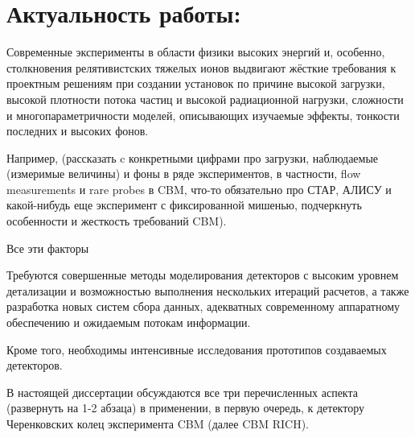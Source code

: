 \section*{Актуальность работы:}

Современные эксперименты в области физики высоких энергий и, особенно, столкновения релятивистских тяжелых ионов выдвигают жёсткие требования к проектным решениям при создании установок по причине высокой загрузки, высокой плотности потока частиц и высокой радиационной нагрузки, сложности и многопараметричности моделей, описывающих изучаемые эффекты, тонкости последних и высоких фонов.

Например, (рассказать c конкретными цифрами про загрузки, наблюдаемые (измеримые величины) и фоны в ряде экспериментов, в частности, flow measurements и rare probes в CBM, что-то обязательно про СТАР, АЛИСУ и какой-нибудь еще эксперимент с фиксированной мишенью, подчеркнуть особенности и жесткость требований CBM).

Все эти факторы

Требуются совершенные методы моделирования детекторов с высоким уровнем детализации и возможностью выполнения нескольких итераций расчетов, а также разработка новых систем сбора данных, адекватных современному аппаратному обеспечению и ожидаемым потокам информации.

Кроме того, необходимы интенсивные исследования прототипов создаваемых детекторов.

В настоящей диссертации обсуждаются все три перечисленных аспекта (развернуть на 1-2 абзаца) в применении, в первую очередь, к детектору Черенковских колец эксперимента CBM (далее CBM RICH).
